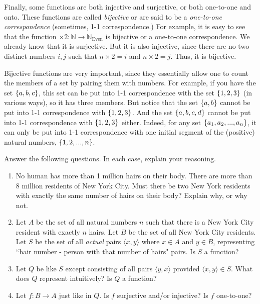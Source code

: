 Finally, some functions are both injective and surjective, or both one-to-one and onto. These functions are called \textit{bijective} or are said to be a \textit{one-to-one correspondence} (sometimes, 1-1 correspondence.) For example, it is easy to see that the function $\times2: \mathbb{N}\to \mathbb{N}_\text{Even}$ is bijective or a one-to-one correspondence. We already know that it is surjective. But it is also injective, since there are no two distinct numbers $i, j$ such that $n\times 2=i$ and $n\times 2=j$. Thus, it is bijective. 

Bijective functions are very important, since they essentially allow one to count the members of a set by pairing them with numbers. For example, if you have the set $\{a, b, c\}$, this set can be put into 1-1 correspondence with the set $\{1, 2, 3\}$ (in various ways), so it has three members. But notice that the set $\{a, b\}$ cannot be put into 1-1 correspondence with $\{1, 2, 3\}$. And the set $\{a, b, c, d\}$ cannot be put into 1-1 correspondence with $\{1, 2, 3\}$ either. Indeed, for any set $\{a_1, a_2, ..., a_n\}$, it can only be put into 1-1 correspondence with one initial segment of the (positive) natural numbers, $\{1, 2, ..., n\}$. 

\begin{exc}
	Answer the following questions. In each case, explain your reasoning. 
\begin{enumerate}
	\item No human has more than 1 million hairs on their body. There are more than 8 million residents of New York City. Must there be two New York residents with exactly the same number of hairs on their body? Explain why, or why not. 
	\item Let $A$ be the set of all natural numbers $n$ such that there is a New York City resident with exactly $n$ hairs. Let $B$ be the set of all New York City residents. Let $S$ be the set of all \textit{actual} pairs $\langle x, y \rangle$ where $x \in A$ and $y \in B$, representing ``hair number - person with that number of hairs" pairs. Is $S$ a function?  
	\item Let $Q$ be like $S$ except consisting of all pairs $\langle y, x \rangle$ provided $\langle x, y \rangle \in S$. What does $Q$ represent intuitively? Is $Q$ a function? 
	\item Let $f: B \to A$ just like in $Q$. Is $f$ surjective and/or injective? Is $f$ one-to-one? 
\end{enumerate}
\end{exc}


